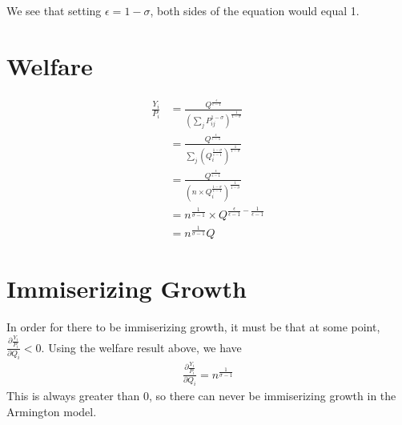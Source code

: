 \documentclass[11pt]{article}
\begin{document}
We see that setting $\epsilon = 1 - \sigma$, both sides of the equation would equal 1. 

\section{Welfare}
\begin{align*}
    \frac{Y_i}{P_i} &= \frac{Q^{\frac{\epsilon}{\epsilon-1}}}{\left(\sum_j P_{ij}^{1-\sigma}\right)^{\frac{1}{1-\sigma}}} \\
    &= \frac{Q^{\frac{\epsilon}{\epsilon-1}}}{\sum_j \left(Q_i^{\frac{1-\sigma}{\epsilon - 1}}\right)^{\frac{1}{1-\sigma}}} \\
    &= \frac{Q^{\frac{\epsilon}{\epsilon-1}}}{ \left(n \times Q_i^{\frac{1-\sigma}{\epsilon - 1}}\right)^{\frac{1}{1-\sigma}}} \\
    &= n^{\frac{1}{\sigma-1}} \times Q^{\frac{\epsilon}{\epsilon - 1} - \frac{1}{\epsilon -1}} \\
    &= n^{\frac{1}{\sigma-1}} Q
\end{align*}

\section{Immiserizing Growth}
In order for there to be immiserizing growth, it must be that at some point, $\frac{\partial \frac{Y_i}{P_i}}{\partial Q_i} < 0$. Using the welfare result above, we have
\begin{align*}
    \frac{\partial \frac{Y_i}{P_i}}{\partial Q_i} = n^{\frac{1}{\sigma-1}} 
\end{align*}
This is always greater than 0, so there can never be immiserizing growth in the Armington model. 
\end{document}
